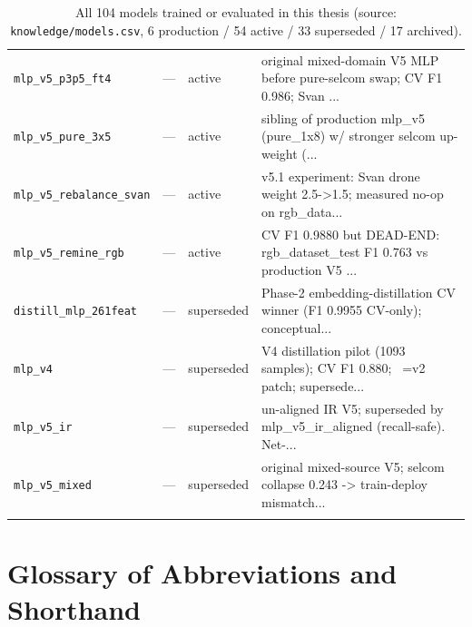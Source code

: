 \documentclass[12pt,a4paper,oneside,openright]{book}
\begin{document}
\begin{longtable}{p{}llp{}}
\texttt{mlp\_v5\_p3p5\_ft4} & --- & active & original mixed-domain V5 MLP before pure-selcom swap; CV F1 0.986; Svan ... \\
\texttt{mlp\_v5\_pure\_3x5} & --- & active & sibling of production mlp\_v5 (pure\_1x8) w/ stronger selcom up-weight (... \\
\texttt{mlp\_v5\_rebalance\_svan} & --- & active & v5.1 experiment: Svan drone weight 2.5->1.5; measured no-op on rgb\_data... \\
\texttt{mlp\_v5\_remine\_rgb} & --- & active & CV F1 0.9880 but DEAD-END: rgb\_dataset\_test F1 0.763 vs production V5 ... \\
\texttt{distill\_mlp\_261feat} & --- & superseded & Phase-2 embedding-distillation CV winner (F1 0.9955 CV-only); conceptual... \\
\texttt{mlp\_v4} & --- & superseded & V4 distillation pilot (1093 samples); CV F1 0.880; ~=v2 patch; supersede... \\
\texttt{mlp\_v5\_ir} & --- & superseded & un-aligned IR V5; superseded by mlp\_v5\_ir\_aligned (recall-safe). Net-... \\
\texttt{mlp\_v5\_mixed} & --- & superseded & original mixed-source V5; selcom collapse 0.243 -> train-deploy mismatch... \\
\midrule
\bottomrule
\caption{All 104 models trained or evaluated in this thesis (source: \texttt{knowledge/models.csv}, 6 production / 54 active / 33 superseded / 17 archived).}
\label{tab:models_evaluated}
\end{longtable}
\normalsize


\chapter{Glossary of Abbreviations and Shorthand}
\label{app:glossary}
\end{document}

